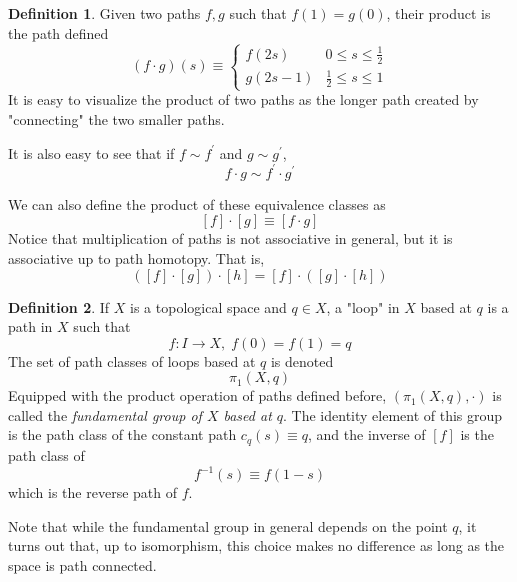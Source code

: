 \documentclass{article}
\theoremstyle{remark}
\theoremstyle{definition}
\newtheorem{definition}{Definition}[section]
\begin{document}
\begin{definition}
Given two paths $f, g$ such that $f(1) = g(0)$, their product is the path defined
\[(f \cdot g) (s) \equiv \begin{cases}
      f(2s) & 0 \leq s \leq \frac{1}{2} \\
      g(2s - 1) & \frac{1}{2} \leq s \leq 1
\end{cases}\]
It is easy to visualize the product of two paths as the longer path created by "connecting" the two smaller paths. 
\begin{center}
\end{center}
It is also easy to see that if $f \sim f^\prime$ and $g \sim g^\prime$, 
\[f \cdot g \sim f^\prime \cdot g^\prime\]
\end{definition}

We can also define the product of these equivalence classes as
\[[f] \cdot [g] \equiv [f \cdot g]\]
Notice that multiplication of paths is not associative in general, but it is associative up to path homotopy. That is, 
\[([f] \cdot [g]) \cdot [h] = [f] \cdot ([g] \cdot [h])\]

\begin{definition}
If $X$ is a topological space and $q \in X$, a "loop" in $X$ based at $q$ is a path in $X$ such that
\[f: I\longrightarrow X, \; f(0) = f(1) = q\]
The set of path classes of loops based at $q$ is denoted
\[\pi_1 (X, q)\]
Equipped with the product operation of paths defined before, $(\pi_1 (X, q), \cdot)$ is called the \textit{fundamental group of $X$ based at $q$}. The identity element of this group is the path class of the constant path $c_q(s) \equiv q$, and the inverse of $[f]$ is the path class of 
\[f^{-1} (s) \equiv f(1-s)\]
which is the reverse path of $f$. 
\end{definition}

Note that while the fundamental group in general depends on the point $q$, it turns out that, up to isomorphism, this choice makes no difference as long as the space is path connected. 
\end{document}
